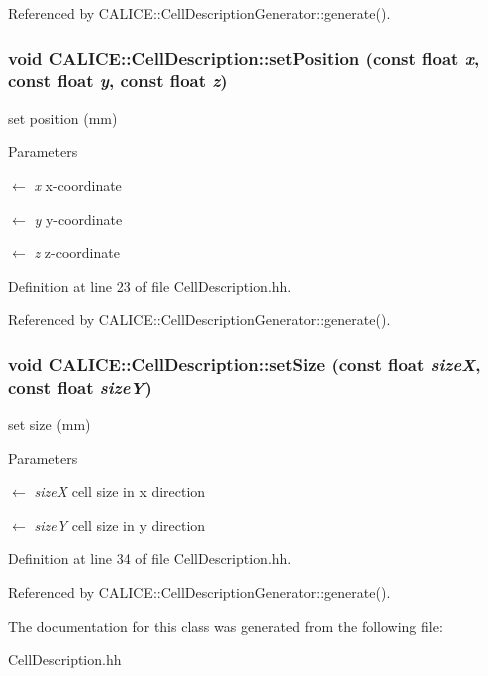 Referenced by CALICE::CellDescriptionGenerator::generate().
\subsubsection[{setPosition}]{\setlength{\rightskip}{0pt plus 5cm}void CALICE::CellDescription::setPosition (const float {\em x}, \/  const float {\em y}, \/  const float {\em z})\hspace{0.3cm}{\ttfamily  [inline]}}\label{classCALICE_1_1CellDescription_a7b6d61b36cae2fb43ede42e57b660df1}


set position (mm) 
\begin{DoxyParams}{Parameters}
\item[\mbox{$\leftarrow$} {\em x}]x-\/coordinate \item[\mbox{$\leftarrow$} {\em y}]y-\/coordinate \item[\mbox{$\leftarrow$} {\em z}]z-\/coordinate \end{DoxyParams}


Definition at line 23 of file CellDescription.hh.

Referenced by CALICE::CellDescriptionGenerator::generate().
\subsubsection[{setSize}]{\setlength{\rightskip}{0pt plus 5cm}void CALICE::CellDescription::setSize (const float {\em sizeX}, \/  const float {\em sizeY})\hspace{0.3cm}{\ttfamily  [inline]}}\label{classCALICE_1_1CellDescription_a7a5a039b6faff7ad630133fe3413db57}


set size (mm) 
\begin{DoxyParams}{Parameters}
\item[\mbox{$\leftarrow$} {\em sizeX}]cell size in x direction \item[\mbox{$\leftarrow$} {\em sizeY}]cell size in y direction \end{DoxyParams}


Definition at line 34 of file CellDescription.hh.

Referenced by CALICE::CellDescriptionGenerator::generate().

The documentation for this class was generated from the following file:\begin{DoxyCompactItemize}
\item 
CellDescription.hh\end{DoxyCompactItemize}
